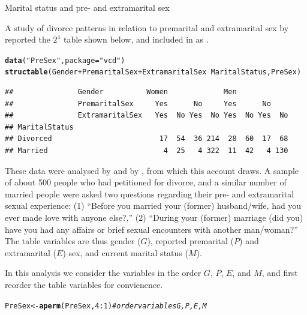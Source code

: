 \documentclass[11pt]{book}\usepackage[]{graphicx}\usepackage[]{color}
\makeatletter
\newcommand{\hlnum}[1]{\textcolor[rgb]{0.686,0.059,0.569}{#1}}%
\newcommand{\hlstr}[1]{\textcolor[rgb]{0.192,0.494,0.8}{#1}}%
\newcommand{\hlcom}[1]{\textcolor[rgb]{0.678,0.584,0.686}{\textit{#1}}}%
\newcommand{\hlopt}[1]{\textcolor[rgb]{0,0,0}{#1}}%
\newcommand{\hlstd}[1]{\textcolor[rgb]{0.345,0.345,0.345}{#1}}%
\newcommand{\hlkwb}[1]{\textcolor[rgb]{0.69,0.353,0.396}{#1}}%
\newcommand{\hlkwc}[1]{\textcolor[rgb]{0.333,0.667,0.333}{#1}}%
\newcommand{\hlkwd}[1]{\textcolor[rgb]{0.737,0.353,0.396}{\textbf{#1}}}%
\newenvironment{kframe}{%
 \def\at@end@of@kframe{}%
 \ifinner\ifhmode%
  \def\at@end@of@kframe{\end{minipage}}%
  \begin{minipage}{\columnwidth}%
 \fi\fi%
 \def\FrameCommand##1{\hskip\@totalleftmargin \hskip-\fboxsep
 \colorbox{shadecolor}{##1}\hskip-\fboxsep
     \hskip-\linewidth \hskip-\@totalleftmargin \hskip\columnwidth}%
 \MakeFramed {\advance\hsize-\width
   \@totalleftmargin\z@ \linewidth\hsize
   \@setminipage}}%
 {\par\unskip\endMakeFramed%
 \at@end@of@kframe}
\newenvironment{knitrout}{}{} %
\renewenvironment{knitrout}{\small\renewcommand{\baselinestretch}{.85}}{} %
\makeatother
\begin{document}
\begin{Example}[marital1]{Marital status and pre- and extramarital sex}

A study of divorce patterns in relation to premarital and extramarital sex
by \citet{ThornesCollard:79} reported
the \(2^4\) table shown below, and included in  as
.

\begin{knitrout}
\color{fgcolor}\begin{kframe}
\begin{alltt}
\hlkwd{data}\hlstd{(}\hlstr{"PreSex"}\hlstd{,} \hlkwc{package}\hlstd{=}\hlstr{"vcd"}\hlstd{)}
\hlkwd{structable}\hlstd{(Gender}\hlopt{+}\hlstd{PremaritalSex}\hlopt{+}\hlstd{ExtramaritalSex} \hlopt{~} \hlstd{MaritalStatus, PreSex)}
\end{alltt}
\begin{verbatim}
##               Gender          Women             Men            
##               PremaritalSex     Yes      No     Yes      No    
##               ExtramaritalSex   Yes  No Yes  No Yes  No Yes  No
## MaritalStatus                                                  
## Divorced                         17  54  36 214  28  60  17  68
## Married                           4  25   4 322  11  42   4 130
\end{verbatim}
\end{kframe}
\end{knitrout}


These data were analysed by \citet[\S 6.1.7]{Agresti:2012}
and by \citet{Friendly:94a,Friendly:00:VCD}, from which this account draws.
A sample of
about 500 people who had petitioned for divorce, and a similar number
of married people were asked two questions regarding their pre- and
extramarital sexual experience:  (1) ``Before you married your
(former) husband/wife, had you ever made love with anyone else?,''
(2) ``During your (former) marriage (did you) have you had any
affairs or brief sexual encounters with another man/woman?'' 
The
table variables are thus gender ($G$), reported premarital ($P$)
and extramarital ($E$) sex, and current marital status ($M$).

In this analysis we consider the variables in the order $G$, $P$,
$E$, and $M$, and first reorder the table variables for
convienence.
\begin{knitrout}
\color{fgcolor}\begin{kframe}
\begin{alltt}
\hlstd{PreSex} \hlkwb{<-} \hlkwd{aperm}\hlstd{(PreSex,} \hlnum{4}\hlopt{:}\hlnum{1}\hlstd{)}   \hlcom{# order variables G, P, E, M}
\end{alltt}
\end{kframe}
\end{knitrout}




\end{Example}
\end{document}
